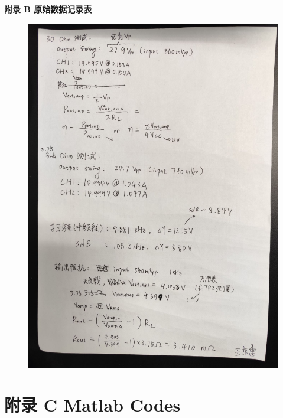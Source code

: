 \documentclass[UTF8]{article}
\begin{document}
\newpage
\begin{center}\Huge{\bfseries 
    附录 B\hspace*{20pt} 原始数据记录表
}\end{center}
\thispagestyle{fancy} 
\begin{figure}[H]\centering
    \includegraphics[width=0.9\columnwidth]{LCE-03-功率放大器/assets/附录/原始数据.png}
\end{figure}

\newpage
\section*{附录 C \hspace*{20pt} Matlab Codes}
\thispagestyle{fancy} 

\end{document}
